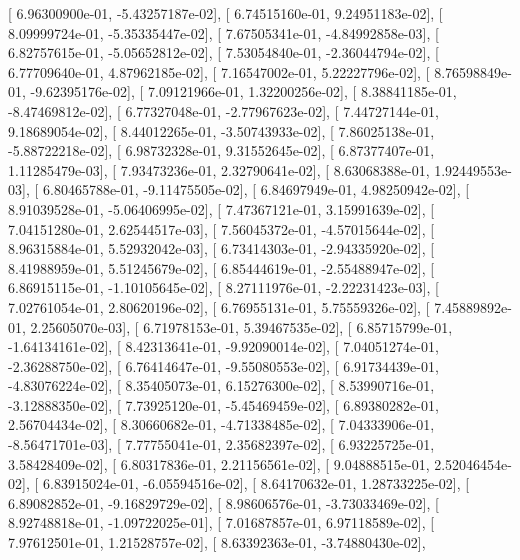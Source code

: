 \documentclass{article}
\begin{document}
       [  6.96300900e-01,  -5.43257187e-02],
       [  6.74515160e-01,   9.24951183e-02],
       [  8.09999724e-01,  -5.35335447e-02],
       [  7.67505341e-01,  -4.84992858e-03],
       [  6.82757615e-01,  -5.05652812e-02],
       [  7.53054840e-01,  -2.36044794e-02],
       [  6.77709640e-01,   4.87962185e-02],
       [  7.16547002e-01,   5.22227796e-02],
       [  8.76598849e-01,  -9.62395176e-02],
       [  7.09121966e-01,   1.32200256e-02],
       [  8.38841185e-01,  -8.47469812e-02],
       [  6.77327048e-01,  -2.77967623e-02],
       [  7.44727144e-01,   9.18689054e-02],
       [  8.44012265e-01,  -3.50743933e-02],
       [  7.86025138e-01,  -5.88722218e-02],
       [  6.98732328e-01,   9.31552645e-02],
       [  6.87377407e-01,   1.11285479e-03],
       [  7.93473236e-01,   2.32790641e-02],
       [  8.63068388e-01,   1.92449553e-03],
       [  6.80465788e-01,  -9.11475505e-02],
       [  6.84697949e-01,   4.98250942e-02],
       [  8.91039528e-01,  -5.06406995e-02],
       [  7.47367121e-01,   3.15991639e-02],
       [  7.04151280e-01,   2.62544517e-03],
       [  7.56045372e-01,  -4.57015644e-02],
       [  8.96315884e-01,   5.52932042e-03],
       [  6.73414303e-01,  -2.94335920e-02],
       [  8.41988959e-01,   5.51245679e-02],
       [  6.85444619e-01,  -2.55488947e-02],
       [  6.86915115e-01,  -1.10105645e-02],
       [  8.27111976e-01,  -2.22231423e-03],
       [  7.02761054e-01,   2.80620196e-02],
       [  6.76955131e-01,   5.75559326e-02],
       [  7.45889892e-01,   2.25605070e-03],
       [  6.71978153e-01,   5.39467535e-02],
       [  6.85715799e-01,  -1.64134161e-02],
       [  8.42313641e-01,  -9.92090014e-02],
       [  7.04051274e-01,  -2.36288750e-02],
       [  6.76414647e-01,  -9.55080553e-02],
       [  6.91734439e-01,  -4.83076224e-02],
       [  8.35405073e-01,   6.15276300e-02],
       [  8.53990716e-01,  -3.12888350e-02],
       [  7.73925120e-01,  -5.45469459e-02],
       [  6.89380282e-01,   2.56704434e-02],
       [  8.30660682e-01,  -4.71338485e-02],
       [  7.04333906e-01,  -8.56471701e-03],
       [  7.77755041e-01,   2.35682397e-02],
       [  6.93225725e-01,   3.58428409e-02],
       [  6.80317836e-01,   2.21156561e-02],
       [  9.04888515e-01,   2.52046454e-02],
       [  6.83915024e-01,  -6.05594516e-02],
       [  8.64170632e-01,   1.28733225e-02],
       [  6.89082852e-01,  -9.16829729e-02],
       [  8.98606576e-01,  -3.73033469e-02],
       [  8.92748818e-01,  -1.09722025e-01],
       [  7.01687857e-01,   6.97118589e-02],
       [  7.97612501e-01,   1.21528757e-02],
       [  8.63392363e-01,  -3.74880430e-02],
\end{document}

